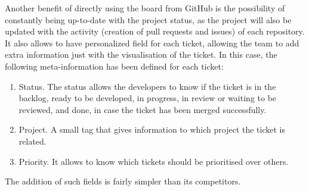\documentclass[../memory.tex]{subfiles}
\begin{document}
Another benefit of directly using the board from GitHub is the possibility of
constantly being up-to-date with the project status, as the project will also be
updated with the activity (creation of pull requests and issues) of each
repository.
\\
It also allows to have personalized field for each ticket, allowing the team to
add extra information just with the visualisation of the ticket. In this case,
the following meta-information has been defined for each ticket:
\begin{enumerate}[label = -]
	\item Status. The status allows the developers to know if the ticket is in the
	      backlog, ready to be developed, in progress, in review or waiting to be
	      reviewed, and done, in case the ticket has been merged successfully.
	\item Project. A small tag that gives information to which project the ticket
	      is related.
	\item Priority. It allows to know which tickets should be prioritised over
	      others.
\end{enumerate}
The addition of such fields is fairly simpler than its competitors.
\end{document}
